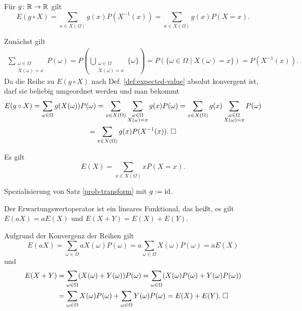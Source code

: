 \begin{Satz}\label{prob-transform}
Für $g\colon\mathbb R\to\mathbb R$ gilt
\[E(g\circ X) = \sum_{x\in X(\Omega)} g(x)P(X^{-1}(x))
= \sum_{x\in X(\Omega)} g(x)P(X=x).\]
\end{Satz}
 Zunächst gilt
\begin{gather*}
\sum_{\substack{\omega\in\Omega\\ X(\omega)=x}}P(\omega)
= P(\bigcup_{\substack{\omega\in\Omega\\ X(\omega)=x}} \{\omega\})
= P(\{\omega\in\Omega\mid X(\omega)=x\})
= P(X^{-1}(x)).
\end{gather*}
Da die Reihe zu $E(g\circ X)$ nach Def. \ref{def:expected-value}
absolut konvergent ist, darf sie beliebig umgeordnet werden und
man bekommt
\begin{gather*}
E(g\circ X) = \sum_{\omega\in\Omega}g(X(\omega))P(\omega)
= \sum_{x\in X(\Omega)}\sum_{\substack{\omega\in\Omega\\ X(\omega)=x}} g(x)P(\omega)
= \sum_{x\in X(\Omega)} g(x)\sum_{\substack{\omega\in\Omega\\ X(\omega)=x}}P(\omega)\\
= \sum_{x\in X(\Omega)} g(x)P(X^{-1}(x)).\;\square
\end{gather*}

\begin{Satz}
Es gilt
\[E(X) = \sum_{x\in X(\Omega)} xP(X=x).\]
\end{Satz}
\begin{Beweis} Spezialisierung von Satz \ref{prob-transform} mit
$g:=\operatorname{id}$.\,\qedsymbol
\end{Beweis}

\begin{Satz}\label{expected-value-op-linear}
Der Erwartungswertoperator ist ein lineares Funktional,
das heißt, es gilt $E(aX)=aE(X)$ und $E(X+Y)=E(X)+E(Y)$. 
\end{Satz}
 Aufgrund der Konvergenz der Reihen gilt
\[E(aX) = \sum_{\omega\in\Omega}aX(\omega)P(\omega)
= a\sum_{\omega\in\Omega}X(\omega)P(\omega) = aE(X)\]
und
\begin{align*}
E(X+Y) &= \sum_{\omega\in\Omega} (X(\omega)+Y(\omega))P(\omega)
= \sum_{\omega\in\Omega} (X(\omega)P(\omega)+Y(\omega)P(\omega))\\
&= \sum_{\omega\in\Omega} X(\omega)P(\omega)
+ \sum_{\omega\in\Omega} Y(\omega)P(\omega) = E(X)+E(Y).\;\square
\end{align*}


